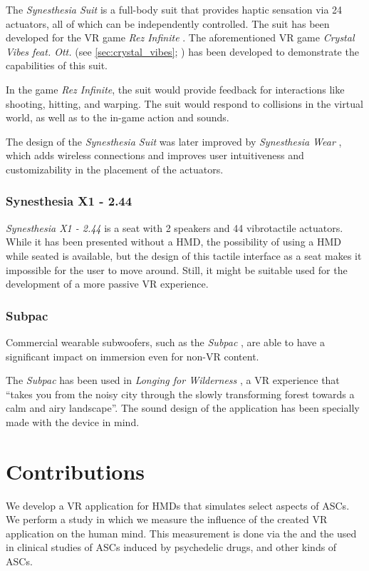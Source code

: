 The \textit{Synesthesia Suit} \autocites{konishi2016synesthesia1}{konishi2016synesthesia2}{synesthesia2016suit} is a full-body suit that provides haptic sensation via 24 actuators, all of which can be independently controlled. The suit has been developed for the \ac{VR} game \textit{Rez Infinite} \autocite{enhance2016rezinfinite}. The aforementioned \ac{VR} game \textit{Crystal Vibes feat. Ott.} (see \ref{sec:crystal_vibes}; \textcite{outram2017crystal}) has been developed to demonstrate the capabilities of this suit.

In the game \textit{Rez Infinite}, the suit would provide feedback for interactions like shooting, hitting, and warping. The suit would respond to collisions in the virtual world, as well as to the in-game action and sounds.

The design of the \textit{Synesthesia Suit} was later improved by \textit{Synesthesia Wear} \autocite{furukawa2019synesthesia}, which adds wireless connections and improves user intuitiveness and customizability in the placement of the actuators.

\subsubsection{Synesthesia X1 - 2.44}
\textit{Synesthesia X1 - 2.44} \autocite{synesthesia2021x1} is a seat with 2 speakers and 44 vibrotactile actuators. While it has been presented without a \ac{HMD}, the possibility of using a \ac{HMD} while seated is available, but the design of this tactile interface as a seat makes it impossible for the user to move around. Still, it might be suitable used for the development of a more passive \ac{VR} experience.

\subsubsection{Subpac}
Commercial wearable subwoofers, such as the \textit{Subpac} \autocite{subpac2013subpac}, are able to have a significant impact on immersion \autocite{drempetic2017wearable} even for non-\ac{VR} content.

The \textit{Subpac} has been used in \textit{Longing for Wilderness} \autocite{zimmermann2016longing}, a \ac{VR} experience that ``takes you from the noisy city through the slowly transforming forest towards a calm and airy landscape''. The sound design of the application has been specially made with the device in mind.

\section{Contributions}
We develop a \ac{VR} application for \acp{HMD} that simulates select aspects of \acp{ASC}.
We perform a study in which we measure the influence of the created \ac{VR} application on the human mind. This measurement is done via the  and the  used in clinical studies of \acp{ASC} induced by psychedelic drugs, and other kinds of \acp{ASC}.
